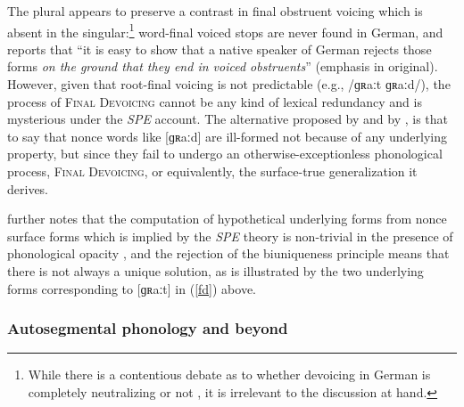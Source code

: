 \noindent The plural appears to preserve a contrast in final obstruent voicing which is absent in the singular:\footnote{While there is a contentious debate as to whether devoicing in German is completely neutralizing \citep[e.g.,][]{Fourakis1984} or not \citep[e.g.,][]{Port1985}, it is irrelevant to the discussion at hand.} word-final voiced stops are never found in German, and \citet[95]{Shibatani1973} reports that ``it is easy to show that a native speaker of German rejects those forms \emph{on the ground that they end in voiced obstruents}'' (emphasis in original). However, given that root-final voicing is not predictable (e.g., /ɡʀaːt \alt{} ɡʀaːd/), the process of \textsc{Final Devoicing} cannot be any kind of lexical redundancy and is mysterious under the \emph{SPE} account. The alternative proposed by \citeauthor{Shibatani1973} and by \citet{Clayton1976}, is that to say that nonce words like [ɡʀaːd] are ill-formed not because of any underlying property, but since they fail to undergo an otherwise-exceptionless phonological process, \textsc{Final Devoicing}, or equivalently, the surface-true generalization it derives.

\citet{Sommerstein1974} further notes that the computation of hypothetical underlying forms from nonce surface forms which is implied by the \emph{SPE} theory is non-trivial in the presence of phonological opacity \citep[see][528f.]{Anderson1988a}, and the rejection of the biuniqueness principle means that there is not always a unique solution, as is illustrated by the two underlying forms corresponding to [ɡʀaːt] in (\ref{fd}) above.

\subsubsection{Autosegmental phonology and beyond}

